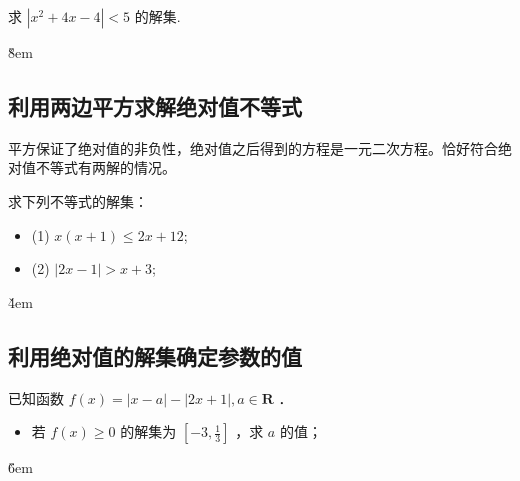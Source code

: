 \begin{example}
    求 $|x^2+4x-4| < 5$ 的解集.
\end{example}

\v{8em}

\subsection{利用两边平方求解绝对值不等式}

\begin{theorem}[两边平方解绝对值不等式]
    平方保证了绝对值的非负性，绝对值之后得到的方程是一元二次方程。恰好符合绝对值不等式有两解的情况。
\end{theorem}

\begin{example}
    求下列不等式的解集：
    \begin{itemize}
        \item (1) $x(x+1) \leq 2 x+12$;
        \item (2) $|2 x-1|>x+3$;
    \end{itemize}
\end{example}

\v{4em}

\subsection{利用绝对值的解集确定参数的值}

\begin{example}
    已知函数 $f(x)=|x-a|-|2 x+1|, a \in \mathbf{R}$ ．
    \begin{itemize}
        \item 若 $f(x) \geq 0$ 的解集为 $\left[-3, \frac{1}{3}\right]$ ，求 $a$ 的值；
    \end{itemize}
\end{example}

\v{6em}
